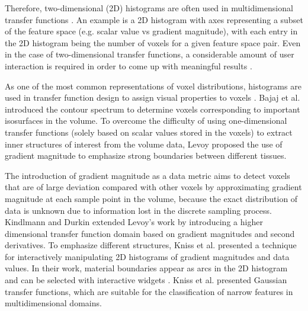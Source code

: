 \documentclass{egpubl}
\begin{document}
Therefore, two-dimensional (2D) histograms are often used in multidimensional transfer functions \cite{maciejewski_structuring_2009}. An example is a 2D histogram with axes representing a subset of the feature space (e.g. scalar value vs gradient magnitude), with each entry in the 2D histogram being the number of voxels for a given feature space pair.
Even in the case of two-dimensional transfer functions, a considerable amount of user interaction is required in order to come up with meaningful results \cite{arens_survey_2010}.

As one of the most common representations of voxel distributions, histograms are used in transfer function design to assign visual properties to voxels \cite{pfister_transfer_2001}. Bajaj et al. \cite{bajaj_contour_1997} introduced the contour spectrum to determine voxels corresponding to important isosurfaces in the volume. To overcome the difficulty of using one-dimensional transfer functions (solely based on scalar values stored in the voxels) to extract inner structures of interest from the volume data, Levoy \cite{levoy_display_1988} proposed the use of gradient magnitude to emphasize strong boundaries between different tissues.

The introduction of gradient magnitude as a data metric aims to detect voxels that are of large deviation compared with other voxels by approximating gradient magnitude at each sample point in the volume, because the exact distribution of data is unknown due to information lost in the discrete sampling process.
Kindlmann and Durkin \cite{kindlmann_semi-automatic_1998} extended Levoy's work \cite{levoy_display_1988} by introducing a higher dimensional transfer function domain based on gradient magnitudes and second derivatives. To emphasize different structures, Kniss et al. \cite{kniss_interactive_2001} presented a technique for interactively manipulating 2D histograms of gradient magnitudes and data values. In their work, material boundaries appear as arcs in the 2D histogram and can be selected with interactive widgets \cite{kniss_multidimensional_2002}.
Kniss et al. \cite{kniss_gaussian_2003} presented Gaussian transfer functions, which are suitable for the classification of narrow features in multidimensional domains.
\end{document}
